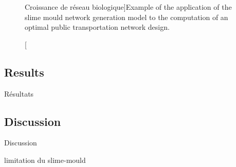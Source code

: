 \begin{figure}
\caption[Biological Network Growth][Croissance de réseau biologique]{Example of the application of the slime mould network generation model to the computation of an optimal public transportation network design.}{}
\label{fig:slimemould}
\end{figure}


\subsection{Results}{Résultats}





\subsection{Discussion}{Discussion}




limitation du slime-mould \cite{adamatzky2010road}




